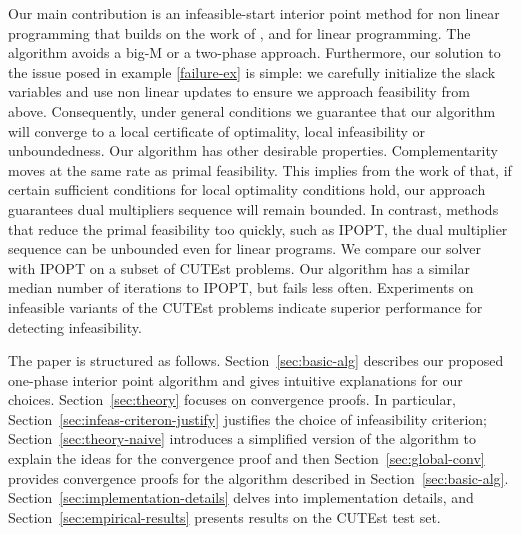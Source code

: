 \documentclass{article}
\begin{document}
Our main contribution is an infeasible-start interior point method for non linear programming that builds on the work of \citet{lustig1990feasibility}, \citet{mehrotra1992implementation} and \citet*{mizuno1993adaptive} for linear programming. The algorithm avoids a big-M or a two-phase approach. Furthermore, our solution to the issue posed in example \eqref{failure-ex} is simple: we carefully initialize the slack variables and use non linear updates to ensure we approach feasibility from above. Consequently, under general conditions we guarantee that our algorithm will converge to a local certificate of optimality, local infeasibility or unboundedness. Our algorithm has other desirable properties. Complementarity moves at the same rate as primal feasibility. This implies from the work of \citet*{haeser2017behavior} that, if certain sufficient conditions for local optimality conditions hold, our approach guarantees dual multipliers sequence will remain bounded. In contrast, methods that reduce the primal feasibility too quickly, such as IPOPT,  the dual multiplier sequence can be unbounded even for linear programs. We compare our solver with IPOPT on a subset of CUTEst problems. Our algorithm has a similar median number of iterations to IPOPT, but fails less often. Experiments on infeasible variants of the CUTEst problems indicate superior performance for detecting infeasibility.

The paper is structured as follows. Section~\ref{sec:basic-alg} describes our proposed one-phase interior point algorithm and gives intuitive explanations for our choices. Section~\ref{sec:theory} focuses on convergence proofs. In particular, Section~\ref{sec:infeas-criteron-justify} justifies the choice of infeasibility criterion; Section~\ref{sec:theory-naive} introduces a simplified version of the algorithm to explain the ideas for the convergence proof and then Section~\ref{sec:global-conv} provides convergence proofs for the algorithm described in Section~\ref{sec:basic-alg}. Section~\ref{sec:implementation-details} delves into implementation details, and Section~\ref{sec:empirical-results} presents results on the CUTEst test set.
\end{document}
